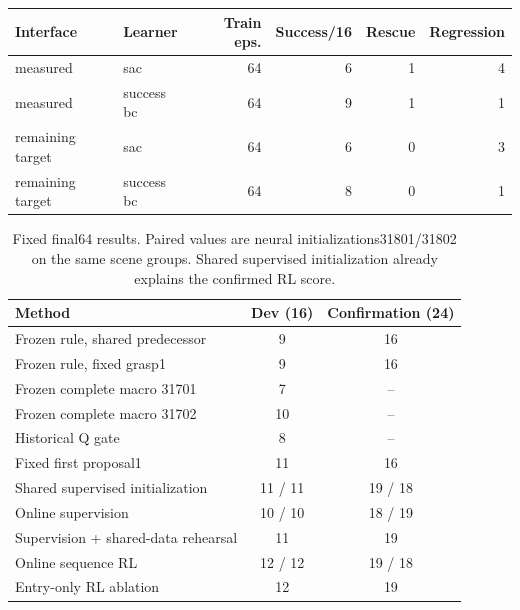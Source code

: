 \begin{tabular}{llrrrr}
\hline
Interface & Learner & Train eps. & Success/16 & Rescue & Regression \\
\hline
measured & sac & 64 & 6 & 1 & 4 \\
measured & success bc & 64 & 9 & 1 & 1 \\
remaining target & sac & 64 & 6 & 0 & 3 \\
remaining target & success bc & 64 & 8 & 0 & 1 \\
\hline
\end{tabular}

\begin{table}[t]
\centering
\begin{tabular}{lcc}
\hline
Method & Dev (16) & Confirmation (24) \\
\hline
Frozen rule, shared predecessor & 9 & 16 \\
Frozen rule, fixed grasp1 & 9 & 16 \\
Frozen complete macro 31701 & 7 & -- \\
Frozen complete macro 31702 & 10 & -- \\
Historical Q gate & 8 & -- \\
Fixed first proposal1 & 11 & 16 \\
Shared supervised initialization & 11 / 11 & 19 / 18 \\
Online supervision & 10 / 10 & 18 / 19 \\
Supervision + shared-data rehearsal & 11 & 19 \\
Online sequence RL & 12 / 12 & 19 / 18 \\
Entry-only RL ablation & 12 & 19 \\
\hline
\end{tabular}
\caption{Fixed final64 results. Paired values are neural initializations31801/31802 on the same scene groups. Shared supervised initialization already explains the confirmed RL score.}
\end{table}
